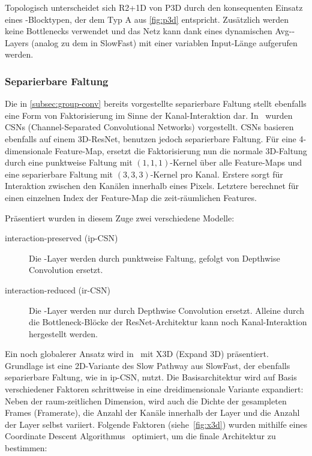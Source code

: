 Topologisch unterscheidet sich R2+1D von P3D durch den konsequenten Einsatz eines \res-Blocktypen, der dem Typ A aus \autoref{fig:p3d} entspricht.
Zusätzlich werden keine Bottlenecks verwendet und das Netz kann dank eines dynamischen Avg-\pool-Layers (analog zu dem in SlowFast) mit einer variablen Input-Länge aufgerufen werden.

\subsubsection{Separierbare Faltung}

Die in \autoref{subsec:group-conv} bereits vorgestellte separierbare Faltung stellt ebenfalls eine Form von Faktorisierung im Sinne der Kanal-Interaktion dar.
In~\cite{Tran19} wurden CSNs (Channel-Separated Convolutional Networks) vorgestellt.
CSNs basieren ebenfalls auf einem 3D-ResNet, benutzen jedoch separierbare Faltung.
Für eine 4-dimensionale Feature-Map, ersetzt die Faktorisierung nun die normale 3D-Faltung durch eine punktweise Faltung mit $(1, 1, 1)$-Kernel über alle Feature-Maps und eine separierbare Faltung mit $(3, 3, 3)$-Kernel pro Kanal.
Erstere sorgt für Interaktion zwischen den Kanälen innerhalb eines Pixels.
Letztere berechnet für einen einzelnen Index der Feature-Map die zeit-räumlichen Features.

Präsentiert wurden in diesem Zuge zwei verschiedene Modelle:
\begin{description}
    \item[interaction-preserved (ip-CSN)] Die \conv-Layer werden durch punktweise Faltung, gefolgt von Depthwise Convolution ersetzt.
    \item[interaction-reduced (ir-CSN)]  Die \conv-Layer werden nur durch Depthwise Convolution ersetzt.
    Alleine durch die Bottleneck-Blöcke der ResNet-Architektur kann noch Kanal-Interaktion hergestellt werden.
\end{description}

Ein noch globalerer Ansatz wird in~\cite{Feichtenhofer20} mit X3D (Expand 3D) präsentiert.
Grundlage ist eine 2D-Variante des Slow Pathway aus SlowFast, der ebenfalls separierbare Faltung, wie in ip-CSN, nutzt.
Die Basisarchitektur wird auf Basis verschiedener Faktoren schrittweise in eine dreidimensionale Variante expandiert:
Neben der raum-zeitlichen Dimension, wird auch die Dichte der gesampleten Frames (Framerate), die Anzahl der Kanäle innerhalb der Layer und die Anzahl der Layer selbst variiert.
Folgende Faktoren (siehe~\autoref{fig:x3d}) wurden mithilfe eines Coordinate Descent Algorithmus~\cite{Wright15} optimiert, um die finale Architektur zu bestimmen:

